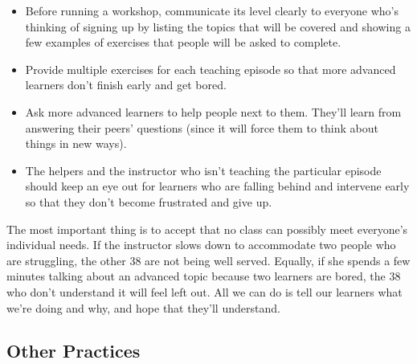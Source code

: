 \begin{itemize}
\item
  Before running a workshop, communicate its level clearly to everyone
  who's thinking of signing up by listing the topics that will be
  covered and showing a few examples of exercises that people will be
  asked to complete.
\item
  Provide multiple exercises for each teaching episode so that more
  advanced learners don't finish early and get bored.
\item
  Ask more advanced learners to help people next to them. They'll learn
  from answering their peers' questions (since it will force them to
  think about things in new ways).
\item
  The helpers and the instructor who isn't teaching the particular
  episode should keep an eye out for learners who are falling behind and
  intervene early so that they don't become frustrated and give up.
\end{itemize}

The most important thing is to accept that no class can possibly meet
everyone's individual needs. If the instructor slows down to accommodate
two people who are struggling, the other 38 are not being well served.
Equally, if she spends a few minutes talking about an advanced topic
because two learners are bored, the 38 who don't understand it will feel
left out. All we can do is tell our learners what we're doing and why,
and hope that they'll understand.

\subsection{Other Practices}\label{other-practices}

